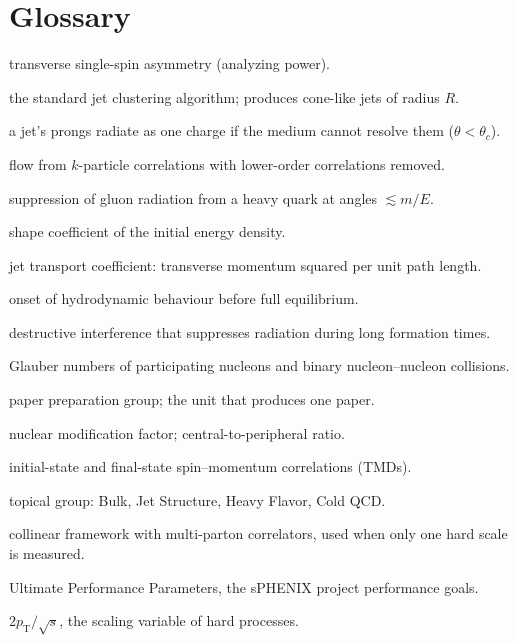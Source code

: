 \documentclass[11pt,letterpaper]{article}
\newcommand{\pT}{p_{\mathrm{T}}}
\newcommand{\RAA}{R_{AA}}
\begin{document}
\section*{Glossary}
\begin{description}[style=nextline,leftmargin=1.2cm,itemsep=0pt]
\item[$A_N$] transverse single-spin asymmetry (analyzing power).
\item[Anti-$k_t$] the standard jet clustering algorithm; produces cone-like jets of radius $R$.
\item[Colour coherence] a jet's prongs radiate as one charge if the medium cannot resolve them ($\theta<\theta_c$).
\item[Cumulant $v_n\{k\}$] flow from $k$-particle correlations with lower-order correlations removed.
\item[Dead cone] suppression of gluon radiation from a heavy quark at angles $\lesssim m/E$.
\item[Eccentricity $\varepsilon_n$] shape coefficient of the initial energy density.
\item[$\hat q$] jet transport coefficient: transverse momentum squared per unit path length.
\item[Hydrodynamization] onset of hydrodynamic behaviour before full equilibrium.
\item[LPM effect] destructive interference that suppresses radiation during long formation times.
\item[$N_{\rm part}$, $N_{\rm coll}$] Glauber numbers of participating nucleons and binary nucleon--nucleon collisions.
\item[PPG] paper preparation group; the unit that produces one paper.
\item[$\RAA$, $R_{CP}$] nuclear modification factor; central-to-peripheral ratio.
\item[Sivers, Collins] initial-state and final-state spin--momentum correlations (TMDs).
\item[TG] topical group: Bulk, Jet Structure, Heavy Flavor, Cold QCD.
\item[Twist-3] collinear framework with multi-parton correlators, used when only one hard scale is measured.
\item[UPP] Ultimate Performance Parameters, the sPHENIX project performance goals.
\item[$x_T$] $2\pT/\sqrt s$, the scaling variable of hard processes.
\end{description}
\end{document}
